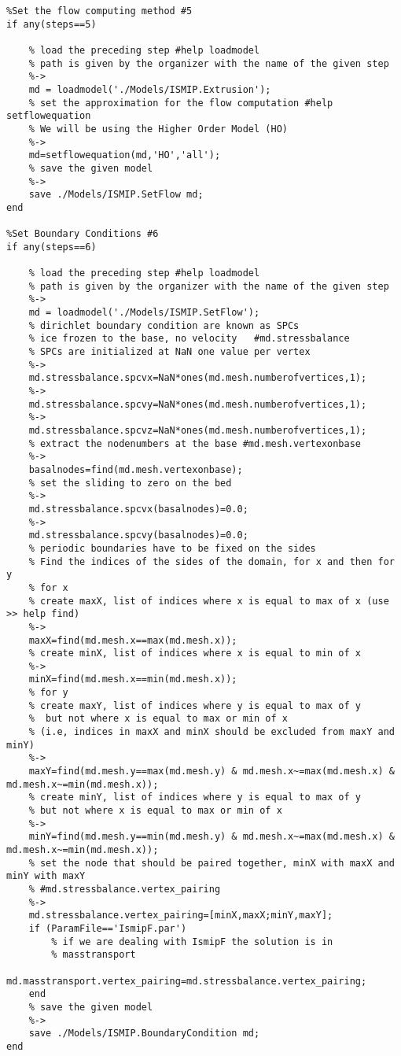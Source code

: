 \begin{verbatim}
%Set the flow computing method #5
if any(steps==5)

	% load the preceding step #help loadmodel
	% path is given by the organizer with the name of the given step
	%->
	md = loadmodel('./Models/ISMIP.Extrusion');
	% set the approximation for the flow computation #help setflowequation
	% We will be using the Higher Order Model (HO)
	%->
	md=setflowequation(md,'HO','all');
	% save the given model
	%->
	save ./Models/ISMIP.SetFlow md;
end

%Set Boundary Conditions #6
if any(steps==6)

	% load the preceding step #help loadmodel
	% path is given by the organizer with the name of the given step
	%->
	md = loadmodel('./Models/ISMIP.SetFlow');
	% dirichlet boundary condition are known as SPCs
	% ice frozen to the base, no velocity	#md.stressbalance
	% SPCs are initialized at NaN one value per vertex
	%->
	md.stressbalance.spcvx=NaN*ones(md.mesh.numberofvertices,1);
	%->
	md.stressbalance.spcvy=NaN*ones(md.mesh.numberofvertices,1);
	%->
	md.stressbalance.spcvz=NaN*ones(md.mesh.numberofvertices,1);
	% extract the nodenumbers at the base #md.mesh.vertexonbase
	%->
	basalnodes=find(md.mesh.vertexonbase);
	% set the sliding to zero on the bed
	%->
	md.stressbalance.spcvx(basalnodes)=0.0;
	%->
	md.stressbalance.spcvy(basalnodes)=0.0;
	% periodic boundaries have to be fixed on the sides
	% Find the indices of the sides of the domain, for x and then for y
	% for x
	% create maxX, list of indices where x is equal to max of x (use >> help find)
	%->
	maxX=find(md.mesh.x==max(md.mesh.x));
	% create minX, list of indices where x is equal to min of x
	%->
	minX=find(md.mesh.x==min(md.mesh.x));
	% for y
	% create maxY, list of indices where y is equal to max of y
	%  but not where x is equal to max or min of x
	% (i.e, indices in maxX and minX should be excluded from maxY and minY)
	%->
	maxY=find(md.mesh.y==max(md.mesh.y) & md.mesh.x~=max(md.mesh.x) & md.mesh.x~=min(md.mesh.x));
	% create minY, list of indices where y is equal to max of y
	% but not where x is equal to max or min of x
	%->
	minY=find(md.mesh.y==min(md.mesh.y) & md.mesh.x~=max(md.mesh.x) & md.mesh.x~=min(md.mesh.x));
	% set the node that should be paired together, minX with maxX and minY with maxY
	% #md.stressbalance.vertex_pairing
	%->
	md.stressbalance.vertex_pairing=[minX,maxX;minY,maxY];
	if (ParamFile=='IsmipF.par')
		% if we are dealing with IsmipF the solution is in
		% masstransport
		md.masstransport.vertex_pairing=md.stressbalance.vertex_pairing;
	end
	% save the given model
	%->
	save ./Models/ISMIP.BoundaryCondition md;
end


\end{verbatim}
